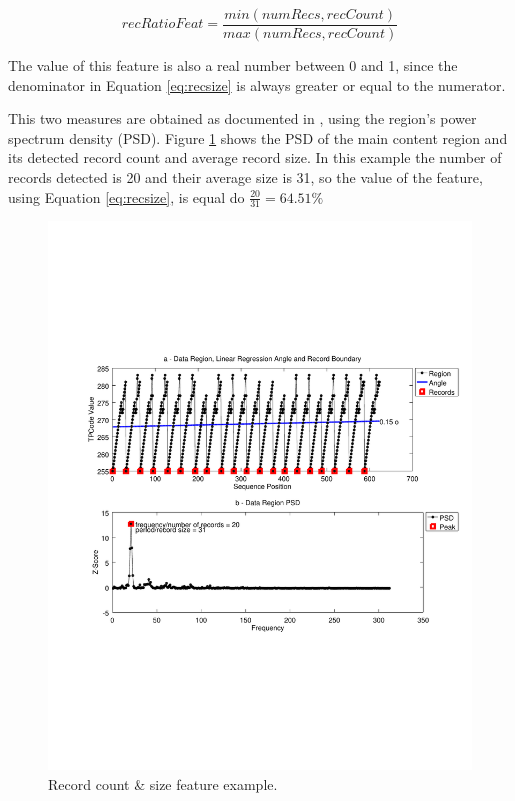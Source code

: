 \begin{equation}\label{eq:recsize}
recRatioFeat = \frac{min(numRecs, recCount)}{max(numRecs, recCount)}
\end{equation}

The value of this feature is also a real number between 0 and 1, since the
denominator in Equation \ref{eq:recsize} is always greater or equal to the
numerator.

This two measures are obtained as documented in
\cite{Velloso:2017:ERW:3132847.3132875}, using the region's power spectrum
density (PSD).
Figure \ref{fig:fft} shows the PSD of the main content region
and its detected record count and average record size. In this example the
number of records detected is 20 and their average size is 31, so the value of
the feature, using Equation \ref{eq:recsize}, is equal do $\frac{20}{31}=64.51\%$

\begin{figure}[h]
  \centering
     \includegraphics[trim={2.0cm 7.4cm 0.7cm 7.4cm}, clip,  width=\columnwidth]{img/fftreg.pdf}
  \caption{Record count \& size feature example.}
  \label{fig:fft}
\end{figure}

